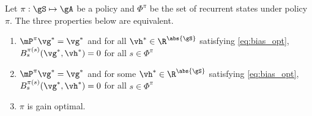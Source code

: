 \begin{lem}
    \label{ch:mdp:lem:opt_pol}
    Let $\pi:\gS\mapsto\gA$ be a policy and $\Phi^\pi$ be the set of recurrent states under policy $\pi$.
    The three properties below are equivalent.
    \begin{enumerate}[label=(\roman*)]
        \item \label{it:opt_pol1} $\mP^\pi\vg^*=\vg^*$ and for all $\vh^*\in \R^{\abs{\gS}}$ satisfying \eqref{eq:bias_opt}, $B^{\pi(s)}_s(\vg^*,\vh^*)=0$ for all $s\in\Phi^\pi$
        \item \label{it:opt_pol2} $\mP^\pi\vg^*=\vg^*$ and for some $\vh^*\in \R^{\abs{\gS}}$ satisfying \eqref{eq:bias_opt}, $B^{\pi(s)}_s(\vg^*,\vh^*)=0$ for all $s\in\Phi^\pi$
        \item \label{it:opt_pol3} $\pi$ is gain optimal.
    \end{enumerate}
\end{lem}
